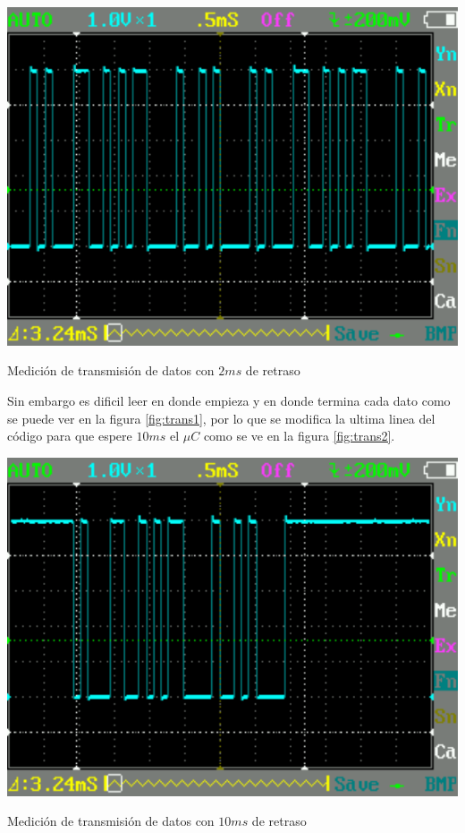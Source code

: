		\begin{marginfigure}
			\begin{center}
				\includegraphics[width=\textwidth]{images/1ln2ms.pdf}
				\caption{Medición de transmisión de datos con $2ms$ de retraso}
				\label{fig:trans1}
			\end{center}
		\end{marginfigure}

		Sin embargo es dificil leer en donde empieza y en donde termina cada dato como se puede ver en la figura \ref{fig:trans1}, por lo que se modifica la ultima linea del código para que espere $10ms$ el $\mu C$ como se ve en la figura \ref{fig:trans2}.

		\begin{marginfigure}
			\begin{center}
				\includegraphics[width=\textwidth]{images/1ln10ms.pdf}
				\caption{Medición de transmisión de datos con $10ms$ de retraso}
				\label{fig:trans2}
			\end{center}
		\end{marginfigure}

